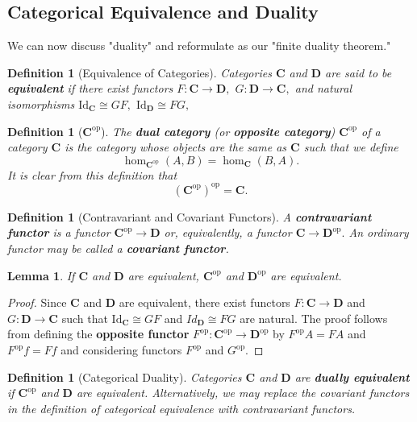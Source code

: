 \documentclass{article}
\newtheorem{lemma}[proposition]{Lemma}
\newtheorem{definition}[proposition]{Definition}
\numberwithin{equation}{section}
\newcommand{\cat}[1]{{\mathbf{#1}}}
\newcommand{\Id}{\mathrm{Id}}
\newcommand{\op}{\mathrm{op}}
\begin{document}
\subsection{Categorical Equivalence and Duality}

We can now discuss "duality" and reformulate  as our "finite duality theorem."

\begin{definition}[Equivalence of Categories]
Categories $\cat{C}$ and $\cat{D}$ are said to be \textbf{equivalent} if there exist functors $F : \cat{C} \to \cat{D},$ $G : \cat{D} \to \cat{C},$ and natural isomorphisms $\Id_\cat{C} \cong GF,$ $\Id_\cat{D} \cong FG,$ 
\end{definition}

\begin{definition}[$\cat{C}^\op$]
The \textbf{dual category} (or \textbf{opposite category}) $\cat{C}^\op$ of a category $\cat{C}$ is the category whose objects are the same as $\cat{C}$ such that we define $$\hom_{\cat{C}^\op}(A, B) = \hom_\cat{C}(B, A).$$ It is clear from this definition that $$(\cat{C}^\op)^\op = \cat{C}.$$
\end{definition}

\begin{definition}[Contravariant and Covariant Functors]
A \textbf{contravariant functor} is a functor $\cat{C}^\op \to \cat{D}$ or, equivalently, a functor $\cat{C} \to \cat{D}^\op.$ An ordinary functor may be called a \textbf{covariant functor}. 
\end{definition}

\begin{lemma}
If $\cat{C}$ and $\cat{D}$ are equivalent, $\cat{C}^\op$ and $\cat{D}^\op$ are equivalent.
\end{lemma}

\begin{proof}
Since $\cat{C}$ and $\cat{D}$ are equivalent, there exist functors $F : \cat{C} \to \cat{D}$ and $G : \cat{D} \to \cat{C}$ such that $\Id_\cat{C} \cong GF$ and $Id_\cat{D} \cong FG$ are natural. The proof follows from defining the \textbf{opposite functor} $F^\op : \cat{C}^\op \to \cat{D}^\op$ by $F^\op A = FA$ and $F^\op f = Ff$ and considering functors $F^\op$ and $G^\op.$
\end{proof}

\begin{definition}[Categorical Duality]
Categories $\cat{C}$ and $\cat{D}$ are \textbf{dually equivalent} if $\cat{C}^\op$ and $\cat{D}$ are equivalent. Alternatively, we may replace the covariant functors in the definition of categorical equivalence with contravariant functors.
\end{definition}
\end{document}
